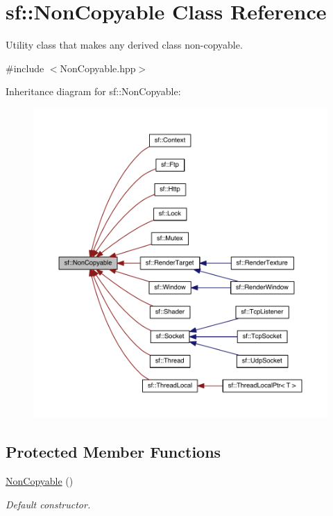 \hypertarget{classsf_1_1_non_copyable}{\section{sf\-:\-:Non\-Copyable Class Reference}
\label{classsf_1_1_non_copyable}
}


Utility class that makes any derived class non-\/copyable.  




{\ttfamily \#include $<$Non\-Copyable.\-hpp$>$}



Inheritance diagram for sf\-:\-:Non\-Copyable\-:
\nopagebreak
\begin{figure}[H]
\begin{center}
\leavevmode
\includegraphics[width=350pt]{classsf_1_1_non_copyable__inherit__graph}
\end{center}
\end{figure}
\subsection*{Protected Member Functions}
\begin{DoxyCompactItemize}
\item 
\hyperlink{classsf_1_1_non_copyable_a2110add170580fdb946f887719da6860}{Non\-Copyable} ()
\begin{DoxyCompactList}\small\item\em Default constructor. \end{DoxyCompactList}\end{DoxyCompactItemize}


